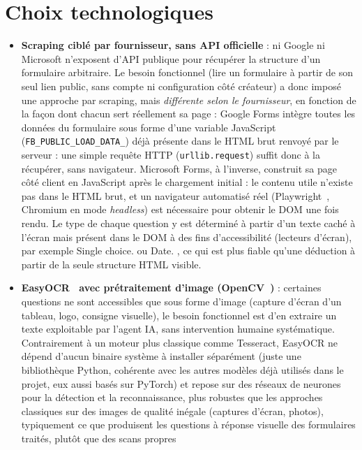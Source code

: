\documentclass[12pt,a4paper]{report}
\begin{document}
\section{Choix technologiques}

\begin{itemize}
    \item \textbf{Scraping ciblé par fournisseur, sans API officielle} : ni Google ni
    Microsoft n'exposent d'API publique pour récupérer la structure d'un formulaire
    arbitraire. Le besoin fonctionnel (lire un formulaire à partir de son seul lien
    public, sans compte ni configuration côté créateur) a donc imposé une approche par
    scraping, mais \emph{différente selon le fournisseur}, en fonction de la façon dont
    chacun sert réellement sa page : Google Forms intègre toutes les données du formulaire
    sous forme d'une variable JavaScript (\texttt{FB\_PUBLIC\_LOAD\_DATA\_}) déjà présente
    dans le HTML brut renvoyé par le serveur : une simple requête HTTP
    (\texttt{urllib.request}) suffit donc à la récupérer, sans navigateur. Microsoft Forms,
    à l'inverse, construit sa page côté client en JavaScript après le chargement initial :
    le contenu utile n'existe pas dans le HTML brut, et un navigateur automatisé réel
    (Playwright~\cite{playwright}, Chromium en mode \emph{headless}) est nécessaire pour obtenir le DOM une
    fois rendu. Le type de chaque question y est déterminé à partir d'un texte caché à
    l'écran mais présent dans le DOM à des fins d'accessibilité (lecteurs d'écran), par
    exemple \og Single choice. \fg{} ou \og Date. \fg{}, ce qui est plus fiable qu'une déduction à
    partir de la seule structure HTML visible.
    \item \textbf{EasyOCR~\cite{easyocr} avec prétraitement d'image (OpenCV~\cite{opencv})} : certaines questions ne
    sont accessibles que sous forme d'image (capture d'écran d'un tableau, logo, consigne
    visuelle), le besoin fonctionnel est d'en extraire un texte exploitable par l'agent
    IA, sans intervention humaine systématique. Contrairement à un moteur plus classique
    comme Tesseract, EasyOCR ne dépend d'aucun binaire système à installer séparément
    (juste une bibliothèque Python, cohérente avec les autres modèles déjà utilisés dans
    le projet, eux aussi basés sur PyTorch) et repose sur des réseaux de neurones pour la
    détection et la reconnaissance, plus robustes que les approches classiques sur des
    images de qualité inégale (captures d'écran, photos), typiquement ce que produisent
    les questions à réponse visuelle des formulaires traités, plutôt que des scans propres

\end{itemize}
\end{document}
